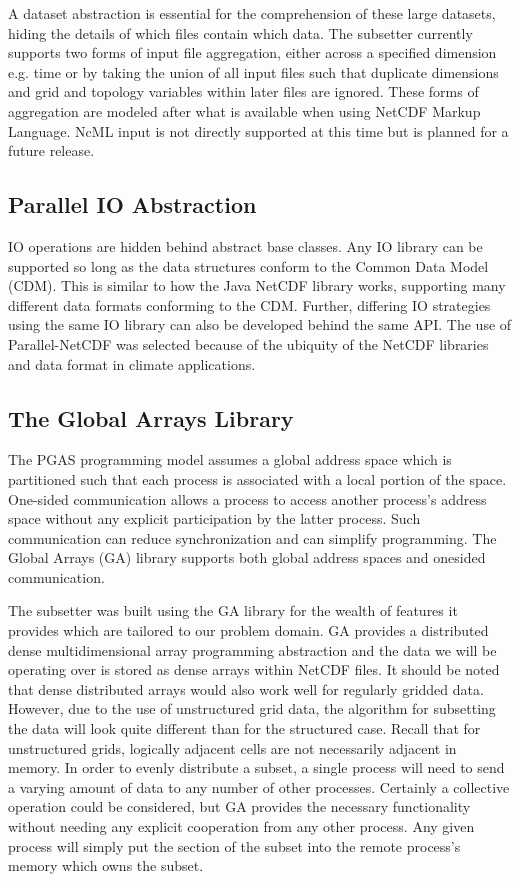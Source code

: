 A dataset abstraction is essential for the comprehension of these large
datasets, hiding the details of which files contain which data.  The subsetter
currently supports two forms of input file aggregation, either across a
specified dimension e.g. time or by taking the union of all input files such
that duplicate dimensions and grid and topology variables within later files
are ignored.  These forms of aggregation are modeled after what is available
when using NetCDF Markup Language\cite{NcML}.  NcML input is not directly
supported at this time but is planned for a future release. 

\subsection{Parallel IO Abstraction}

IO operations are hidden behind abstract base classes.  Any IO library can be
supported so long as the data structures conform to the Common Data Model
(CDM)\cite{CDM}.  This is similar to how the Java NetCDF library works,
supporting many different data formats conforming to the CDM\cite{JavaNetCDF}.
Further, differing IO strategies using the same IO library can also be
developed behind the same API.  The use of Parallel-NetCDF was selected
because of the ubiquity of the NetCDF libraries and data format in climate
applications.

\subsection{The Global Arrays Library}

The PGAS programming model assumes a global address space which is partitioned
such that each process is associated with a local portion of the space.
One-sided communication allows a process to access another process's address
space without any explicit participation by the latter process.  Such
communication can reduce synchronization and can simplify programming.  The
Global Arrays (GA) library supports both global address spaces and onesided
communication.

The subsetter was built using the GA library for the wealth of features it
provides which are tailored to our problem domain.  GA provides a distributed
dense multidimensional array programming abstraction and the data we will be
operating over is stored as dense arrays within NetCDF files.  It should be
noted that dense distributed arrays would also work well for regularly gridded
data.  However, due to the use of unstructured grid data, the algorithm for
subsetting the data will look quite different than for the structured case.
Recall that for unstructured grids, logically adjacent cells are not
necessarily adjacent in memory.  In order to evenly distribute a subset, a
single process will need to send a varying amount of data to any number of
other processes.  Certainly a collective operation could be considered, but GA
provides the necessary functionality without needing any explicit cooperation
from any other process.  Any given process will simply put the section of the
subset into the remote process's memory which owns the subset.

